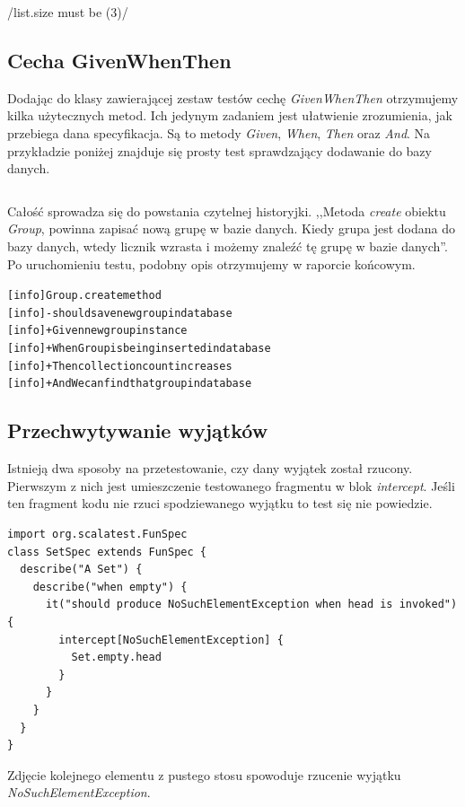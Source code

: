 \documentclass[brudnopis]{xmgr}
\begin{document}
/list.size must be (3)/ 

\subsection{Cecha GivenWhenThen}

Dodając do klasy zawierającej zestaw testów cechę \emph{GivenWhenThen} otrzymujemy kilka użytecznych metod. Ich jedynym zadaniem jest ułatwienie zrozumienia, jak przebiega dana specyfikacja. Są to metody \emph{Given}, \emph{When}, \emph{Then} oraz \emph{And}. Na przykładzie poniżej znajduje się prosty test sprawdzający dodawanie do bazy danych.

\inputminted[fontsize=\small]{scala}{code/givenWhenThen.scala}

Całość sprowadza się do powstania czytelnej historyjki. ,,Metoda \emph{create} obiektu \emph{Group}, powinna zapisać nową grupę w bazie danych. Kiedy grupa jest dodana do bazy danych, wtedy licznik wzrasta i możemy znaleźć tę grupę w bazie danych''. Po uruchomieniu testu, podobny opis otrzymujemy w raporcie końcowym. 

\begin{alltt}
[info] Group.create method
[info] - should save new group in database
[info]   + Given new group instance
[info]   + When Group is being inserted in database 
[info]   + Then collection count increases 
[info]   + And We can find that group in database
\end{alltt}

\subsection{Przechwytywanie wyjątków}

Istnieją dwa sposoby na przetestowanie, czy dany wyjątek został rzucony. Pierwszym z nich jest umieszczenie testowanego fragmentu w blok \emph{intercept}. Jeśli ten fragment kodu nie rzuci spodziewanego wyjątku to test się nie powiedzie.

\begin{verbatim}
import org.scalatest.FunSpec
class SetSpec extends FunSpec {
  describe("A Set") {
    describe("when empty") {
      it("should produce NoSuchElementException when head is invoked") {
        intercept[NoSuchElementException] {
          Set.empty.head
        }
      }
    }
  }
}
\end{verbatim}

Zdjęcie kolejnego elementu z pustego stosu spowoduje rzucenie wyjątku \emph{NoSuchElementException}.
\end{document}
